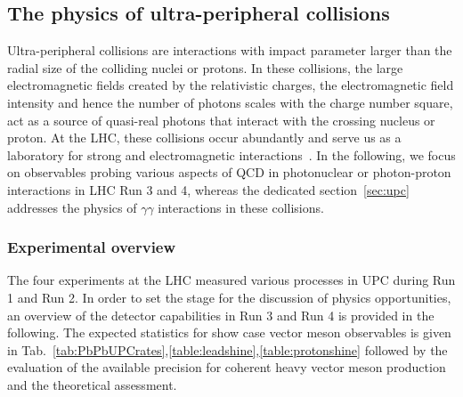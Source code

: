 \documentclass[../report.tex]{subfiles}
\begin{document}
\subsection{The physics of ultra-peripheral collisions}
\label{sec:UPCqcd}
Ultra-peripheral collisions are interactions with impact parameter larger than the radial size of the colliding nuclei or protons. In these collisions, the large electromagnetic fields created by the relativistic charges, the electromagnetic field intensity and hence the number of photons scales with the charge number square, act as a source of quasi-real photons that interact with the crossing nucleus or proton. At the LHC, these collisions occur abundantly and serve us as a laboratory for strong and electromagnetic interactions~\cite{Baltz:2007kq}. In the following, we focus on observables probing various aspects of QCD in photonuclear or photon-proton interactions in LHC Run 3 and 4, whereas the dedicated section~\ref{sec:upc} addresses the physics of $\gamma\gamma$ interactions in these collisions. 

\subsubsection{Experimental overview}
The four experiments at the LHC measured various processes in UPC during Run 1 and Run 2. In order to set the stage for the discussion of physics opportunities,  an overview of the detector capabilities in Run 3 and Run 4 is provided in the following. The expected statistics for show case vector meson observables is given in Tab.~\ref{tab:PbPbUPCrates},\ref{table:leadshine},\ref{table:protonshine} followed by the evaluation of the available precision for coherent heavy vector meson production and the theoretical assessment.
\end{document}
